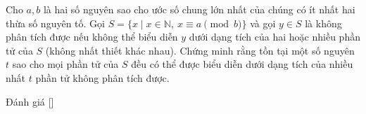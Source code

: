 \ifshowproblem
\begin{problem}\label{problem:CHN-2015-TST3-P3}
	Cho $a, b$ là hai số nguyên sao cho ước số chung lớn nhất của chúng có ít nhất hai thừa số nguyên tố.
	Gọi $S = \{ x \mid x \in \mathbb{N},\ x \equiv a \pmod{b} \}$ và gọi $y \in S$ là không phân tích được
	nếu không thể biểu diễn $y$ dưới dạng tích của hai hoặc nhiều phần tử của $S$ (không nhất thiết khác nhau).
	Chứng minh rằng tồn tại một số nguyên $t$ sao cho mọi phần tử của $S$
	đều có thể được biểu diễn dưới dạng tích của nhiều nhất $t$ phần tử không phân tích được.
\end{problem}
\fi

\ifshowinfo
Đánh giá [\textbf{}]\footnotemark
{}
\fi